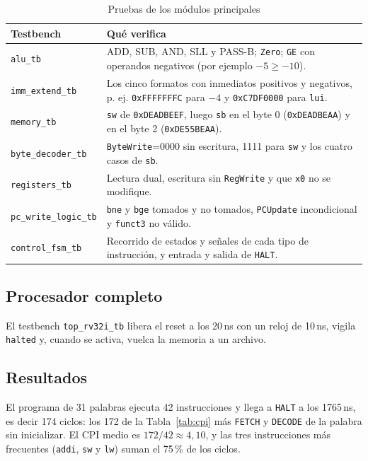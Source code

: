 \documentclass[conference]{IEEEtran}
\newcommand{\cod}[1]{\texttt{\small #1}}
\begin{document}
\begin{table}[t]
\caption{Pruebas de los módulos principales}\label{tab:tb}
\centering\footnotesize
\setlength{\tabcolsep}{3pt}\begin{tabular}{@{}p{3.1cm}p{5.2cm}@{}}\toprule
Testbench & Qué verifica\\\midrule
\cod{alu\_tb} & ADD, SUB, AND, SLL y PASS-B; \cod{Zero}; \cod{GE} con operandos negativos (por ejemplo $-5\ge-10$).\\
\cod{imm\_extend\_tb} & Los cinco formatos con inmediatos positivos y negativos, p. ej. \cod{0xFFFFFFFC} para $-4$ y \cod{0xC7DF0000} para \cod{lui}.\\
\cod{memory\_tb} & \cod{sw} de \cod{0xDEADBEEF}, luego \cod{sb} en el byte 0 (\cod{0xDEADBEAA}) y en el byte 2 (\cod{0xDE55BEAA}).\\
\cod{byte\_decoder\_tb} & \cod{ByteWrite}=0000 sin escritura, 1111 para \cod{sw} y los cuatro casos de \cod{sb}.\\
\cod{registers\_tb} & Lectura dual, escritura sin \cod{RegWrite} y que \cod{x0} no se modifique.\\
\cod{pc\_write\_logic\_tb} & \cod{bne} y \cod{bge} tomados y no tomados, \cod{PCUpdate} incondicional y \cod{funct3} no válido.\\
\cod{control\_fsm\_tb} & Recorrido de estados y señales de cada tipo de instrucción, y entrada y salida de \cod{HALT}.\\\bottomrule
\end{tabular}
\end{table}

\subsection{Procesador completo}
El testbench \cod{top\_rv32i\_tb} libera el reset a los 20\,ns con un reloj de 10\,ns, vigila \cod{halted} y, cuando se activa, vuelca la memoria a un archivo.

\subsection{Resultados}
El programa de 31 palabras ejecuta 42 instrucciones y llega a \cod{HALT} a los 1765\,ns, es decir 174 ciclos: los 172 de la Tabla~\ref{tab:cpi} más \cod{FETCH} y \cod{DECODE} de la palabra sin inicializar. El CPI medio es $172/42\approx4{,}10$, y las tres instrucciones más frecuentes (\cod{addi}, \cod{sw} y \cod{lw}) suman el 75\,\% de los ciclos.
\end{document}

